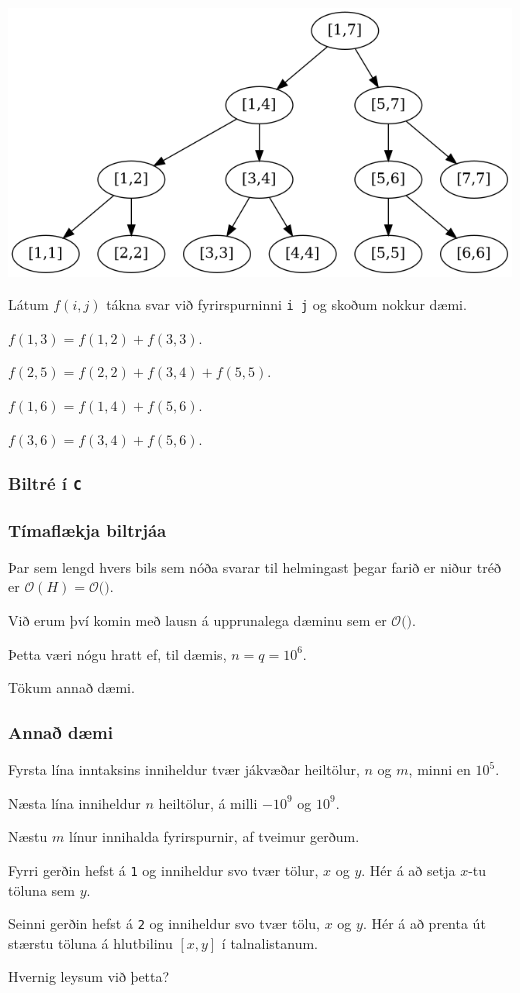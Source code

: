 {
	{
		\includegraphics[scale=0.3]{fig/mynd3.png}
		{
			\item<1-> Látum $f(i, j)$ tákna svar við fyrirspurninni \texttt{i j} og skoðum nokkur dæmi.
			{
				\item<2-> $f(1, 3) = f(1, 2) + f(3, 3)$.
				\item<3-> $f(2, 5) = f(2, 2) + f(3, 4) + f(5, 5)$.
				\item<4-> $f(1, 6) = f(1, 4) + f(5, 6)$.
				\item<5-> $f(3, 6) = f(3, 4) + f(5, 6)$.
			}
		}
	}
}

{
	\frametitle{Biltré í \texttt{C}}
}

{
	\frametitle{Tímaflækja biltrjáa}
	{
		\item<1-> Þar sem lengd hvers bils sem nóða svarar til helmingast þegar farið er niður tréð er
					$\mathcal{O}(H) = \mathcal{O}($\onslide<2->{$\log n$}$)$.
		\item<3-> Við erum því komin með lausn á upprunalega dæminu sem er $\mathcal{O}($\onslide<4->{$q \cdot \log n$}$)$.
		\item<5-> Þetta væri nógu hratt ef, til dæmis, $n = q = 10^6$.
		\item<6-> Tökum annað dæmi.
	}
}

{
	\frametitle{Annað dæmi}
	{
		\item<1-> Fyrsta lína inntaksins inniheldur tvær jákvæðar heiltölur, $n$ og $m$, minni en $10^5$.
		\item<2-> Næsta lína inniheldur $n$ heiltölur, á milli $-10^9$ og $10^9$.
		\item<3-> Næstu $m$ línur innihalda fyrirspurnir, af tveimur gerðum. 
		\item<4-> Fyrri gerðin hefst á \texttt{1} og inniheldur svo tvær tölur, $x$ og $y$. Hér á að setja $x$-tu töluna sem $y$.
		\item<5-> Seinni gerðin hefst á \texttt{2} og inniheldur svo tvær tölu,
			$x$ og $y$. Hér á að prenta út stærstu töluna á hlutbilinu $[x, y]$ í talnalistanum.
		\item<6-> Hvernig leysum við þetta?
	}
}


